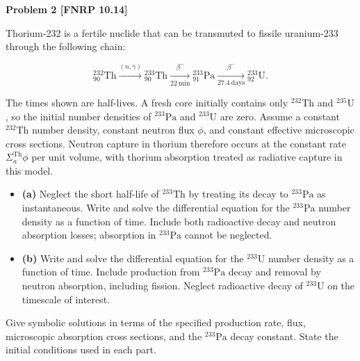 \newpage
\noindent\textbf{Problem 2 [FNRP 10.14]}

Thorium-232 is a fertile nuclide that can be transmuted to fissile uranium-233 through the following chain:

\[
{}^{232}_{90}\mathrm{Th}
\xrightarrow{(n,\gamma)}{}^{233}_{90}\mathrm{Th}
\xrightarrow[22~\mathrm{min}]{\beta^-}{}^{233}_{91}\mathrm{Pa}
\xrightarrow[27.4~\mathrm{days}]{\beta^-}{}^{233}_{92}\mathrm{U}.
\]

The times shown are half-lives. A fresh core initially contains only \({}^{232}\mathrm{Th}\) and \({}^{235}\mathrm{U}\), so the initial number densities of \({}^{233}\mathrm{Pa}\) and \({}^{233}\mathrm{U}\) are zero. Assume a constant \({}^{232}\mathrm{Th}\) number density, constant neutron flux \(\phi\), and constant effective microscopic cross sections. Neutron capture in thorium therefore occurs at the constant rate \(\Sigma_a^{\mathrm{Th}}\phi\) per unit volume, with thorium absorption treated as radiative capture in this model.

\begin{itemize}
\tightlist
\item
  \textbf{(a)} Neglect the short half-life of \({}^{233}\mathrm{Th}\) by treating its decay to \({}^{233}\mathrm{Pa}\) as instantaneous. Write and solve the differential equation for the \({}^{233}\mathrm{Pa}\) number density as a function of time. Include both radioactive decay and neutron absorption losses; absorption in \({}^{233}\mathrm{Pa}\) cannot be neglected.
\item
  \textbf{(b)} Write and solve the differential equation for the \({}^{233}\mathrm{U}\) number density as a function of time. Include production from \({}^{233}\mathrm{Pa}\) decay and removal by neutron absorption, including fission. Neglect radioactive decay of \({}^{233}\mathrm{U}\) on the timescale of interest.
\end{itemize}

Give symbolic solutions in terms of the specified production rate, flux, microscopic absorption cross sections, and the \({}^{233}\mathrm{Pa}\) decay constant. State the initial conditions used in each part.

